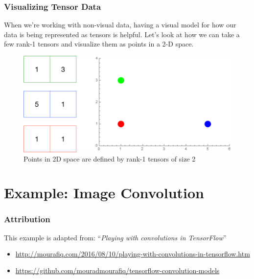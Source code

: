\documentclass{beamer}
\begin{document}
\begin{frame}
  \frametitle{Visualizing Tensor Data}

  When we're working with non-visual data, having a visual model for
  how our data is being represented as tensors is helpful. Let's look
  at how we can take a few rank-1 tensors and visualize them as points
  in a 2-D space.

  \begin{figure}
    \includegraphics[scale=.2]{img/tensor_2d_graph}
    \caption{Points in 2D space are defined by rank-1 tensors of size 2}
  \end{figure}
\end{frame}

\section{Example: Image Convolution}

\begin{frame}
  \frametitle{Attribution}

  This example is adapted from: ``\emph{Playing with convolutions in TensorFlow}''
  \begin{itemize}
    \item \url{http://mourafiq.com/2016/08/10/playing-with-convolutions-in-tensorflow.htm}
    \item \url{https://github.com/mouradmourafiq/tensorflow-convolution-models}
  \end{itemize}
\end{frame}
\end{document}
